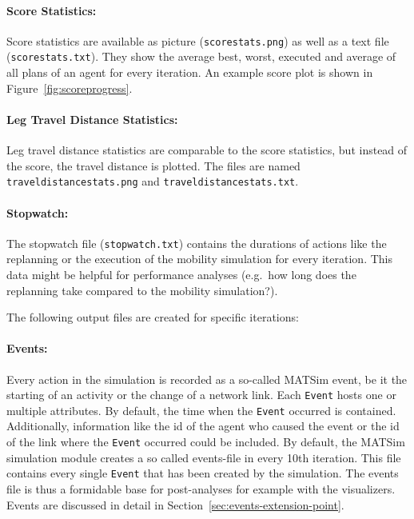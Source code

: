 \paragraph{Score Statistics:}
Score statistics are available as picture (\lstinline|scorestats.png|) as well as a text file (\lstinline|scorestats.txt|). They show the average best, worst, executed and average of all plans of an agent for every iteration. An example score plot is shown in Figure~\ref{fig:scoreprogress}.

\paragraph{Leg Travel Distance Statistics:}
Leg travel distance statistics are comparable to the score statistics, but instead of the score, the travel distance is plotted. The files are named \lstinline|traveldistancestats.png| and \lstinline|traveldistancestats.txt|.

\paragraph{Stopwatch:}
The stopwatch file (\lstinline|stopwatch.txt|) contains the durations of actions like the replanning or the execution of the mobility simulation for every iteration. This data might be helpful for performance analyses (e.g.\ how long does the replanning take compared to the mobility simulation?).



The following output files are created for specific iterations:

\paragraph{Events:} Every action in the simulation is recorded as a so-called MATSim event, be it the starting of an activity or the change of a network link. Each \lstinline|Event| hosts one or multiple attributes. By default, the time when the \lstinline|Event| occurred is contained. Additionally, information like the id of the agent who caused the event or the id of the link where the \lstinline|Event| occurred could be included. By default, the MATSim simulation module creates a so called events-file in every 10th iteration. This file contains every single \lstinline|Event| that has been created by the simulation. The events file is thus a formidable base for post-analyses for example with the visualizers. Events are discussed in detail in Section~\ref{sec:events-extension-point}.

